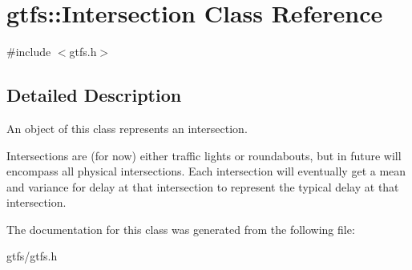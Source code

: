 \hypertarget{classgtfs_1_1Intersection}{}\section{gtfs\+:\+:Intersection Class Reference}
\label{classgtfs_1_1Intersection}


{\ttfamily \#include $<$gtfs.\+h$>$}



\subsection{Detailed Description}
An object of this class represents an intersection.

Intersections are (for now) either traffic lights or roundabouts, but in future will encompass all physical intersections. Each intersection will eventually get a mean and variance for delay at that intersection to represent the typical delay at that intersection. 

The documentation for this class was generated from the following file\+:\begin{DoxyCompactItemize}
\item 
gtfs/gtfs.\+h\end{DoxyCompactItemize}
